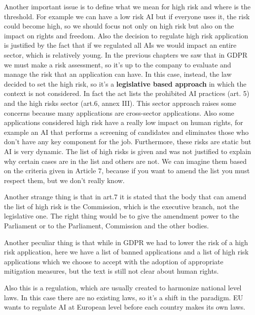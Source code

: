 Another important issue is to define what we mean for high risk and where is the threshold. For example we can have a low risk AI but if everyone uses it, the risk could become high, so we should focus not only on high risk but also on the impact on rights and freedom. Also the decision to regulate high risk application is justified by the fact that if we regulated all AIs we would impact an entire sector, which is relatively young.
In the previous chapters we saw that in GDPR we must make a risk assessment, so it's up to the company to evaluate and manage the risk that an application can have. In this case, instead, the law decided to set the high risk, so it's a \textbf{legislative based approach} in which the context is not considered. In fact the act lists the prohibited AI practices (art. 5) and the high risks sector (art.6, annex III). This sector approach raises some concerns because many applications are cross-sector applications. Also some applications considered high risk have a really low impact on human rights, for example an AI that performs a screening of candidates and eliminates those who don't have any key component for the job. Furthermore, these risks are static but AI is very dynamic. The list of high risks is given and was not justified to explain why certain cases are in the list and others are not. We can imagine them based on the criteria given in Article 7, because if you want to amend the list you must respect them, but we don't really know.

Another strange thing is that in art.7 it is stated that the body that can amend the list of high risk is the Commission, which is  the executive branch, not the legislative one. The right thing would be to give the amendment power to the Parliament or to the Parliament, Commission and the other bodies.

Another peculiar thing is that while in GDPR we had to lower the risk of a high risk application, here we have a list of banned applications and a list of high risk applications which we choose to accept with the adoption of appropriate mitigation measures, but the text is still not clear about human rights.

Also this is a regulation, which are usually created to harmonize national level laws. In this case there are no existing laws, so it's a shift in the paradigm. EU wants to regulate AI at European level before each country makes its own laws.

